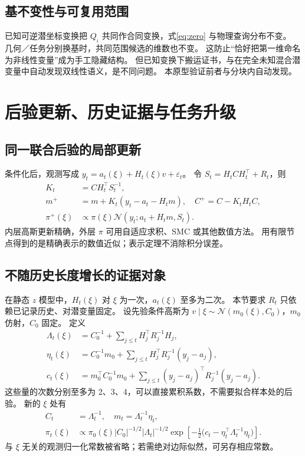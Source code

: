 \documentclass[11pt,a4paper]{article}
\numberwithin{equation}{section}
\theoremstyle{definition}
\newcommand{\N}{\mathcal N}
\begin{document}
\subsection{基不变性与可复用范围}
已知可逆潜坐标变换把 \(Q_\iota\) 共同作合同变换，式\eqref{eq:zero} 与物理查询分布不变。
几何／任务分别换基时，共同范围候选的维数也不变。
这防止“恰好把第一维命名为非线性变量”成为手工隐藏结构。
但已知变换下搬运证书，与在完全未知混合潜变量中自动发现双线性语义，是不同问题。
本原型验证前者与分块内自动发现。

\section{后验更新、历史证据与任务升级}
\label{sec:reuse}

\subsection{同一联合后验的局部更新}
条件化后，观测写成
\(y_t=a_t(\xi)+H_t(\xi)v+\varepsilon_t\)。
令 \(S_t=H_tC H_t^\top+R_t\)，则
\begin{align}
 K_t&=C H_t^\top S_t^{-1},\nonumber\\
 m^+&=m+K_t(y_t-a_t-H_tm),\quad
 C^+=C-K_tH_tC,\\
 \pi^+(\xi)&\propto\pi(\xi)\N(y_t;a_t+H_tm,S_t).
 \label{eq:update}
\end{align}
内层高斯更新精确，外层 \(\pi\) 可用自适应求积、SMC 或其他数值方法。
用有限节点得到的是精确表示的数值近似；表示定理不消除积分误差。

\subsection{不随历史长度增长的证据对象}
在静态 \(z\) 模型中，\(H_t(\xi)\) 对 \(\xi\) 为一次，\(a_t(\xi)\) 至多为二次。
本节要求 \(R_t\) 只依赖已记录历史、对潜变量固定。
设先验条件高斯为 \(v\mid\xi\sim\N(m_0(\xi),C_0)\)，\(m_0\) 仿射，\(C_0\) 固定。
定义
\begin{align}
 \Lambda_t(\xi)&=C_0^{-1}+\sum_{j\le t}H_j^\top R_j^{-1}H_j,\label{eq:statsL}\\
 \eta_t(\xi)&=C_0^{-1}m_0+\sum_{j\le t}H_j^\top R_j^{-1}(y_j-a_j),\label{eq:statsh}\\
 c_t(\xi)&=m_0^\top C_0^{-1}m_0+
       \sum_{j\le t}(y_j-a_j)^\top R_j^{-1}(y_j-a_j).
 \label{eq:statsc}
\end{align}
这些量的次数分别至多为 2、3、4，可以直接累积系数，不需要拟合样本处的后验。
新的 \(\xi\) 处有
\begin{align}
 C_t&=\Lambda_t^{-1},\quad m_t=\Lambda_t^{-1}\eta_t,\\
 \pi_t(\xi)&\propto\pi_0(\xi)|C_0|^{-1/2}|\Lambda_t|^{-1/2}
 \exp\!\left[-\frac12\bigl(c_t-\eta_t^\top\Lambda_t^{-1}\eta_t\bigr)\right].
 \label{eq:evidence}
\end{align}
与 \(\xi\) 无关的观测归一化常数被省略；若需绝对边际似然，可另存相应常数。
\end{document}
